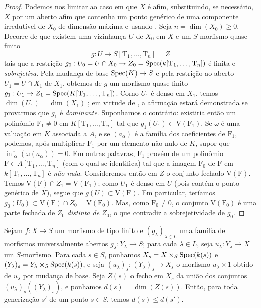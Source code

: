 \begin{proof}
Podemos nos limitar ao caso em que $X$ é afim, substituindo, se necessário, $X$ por um aberto afim que contenha um ponto genérico de uma componente irredutível de $X_0$ de dimensão máxima e usando .
Seja $n=\dim(X_0)\geq 0$.
Decorre de  que existem uma vizinhança $U$ de $X_0$ em $X$ e um $S$-morfismo quase-finito
\[
  g:U\to S[\mathrm{T}_1,\ldots,\mathrm{T}_n]=Z
\]
tais que a restrição $g_0:U_0=U\cap X_0\to Z_0=\Spec(k[\mathrm{T}_1,\ldots,\mathrm{T}_n])$ é finita e \emph{sobrejetiva}.
Pela mudança de base $\Spec(K)\to S$ e pela restrição ao aberto $U_1=U\cap X_1$ de $X_1$, obtemos de $g$ um morfismo quase-finito $g_1:U_1\to Z_1=\Spec(K[\mathrm{T}_1,\ldots,\mathrm{T}_n])$.
Como $U_1$ é denso em $X_1$, temos $\dim(U_1)=\dim(X_1)$ ; em virtude de , a afirmação estará demonstrada se provarmos que $g_1$ é \emph{dominante}.
Suponhamos o contrário: existiria então um polinômio $\mathrm{F}_1\neq 0$ em $K[\mathrm{T}_1,\ldots,\mathrm{T}_n]$ tal que $g_1(U_1)\subset\mathrm{V}(\mathrm{F}_1)$.
Se $\omega$ é uma valuação em $K$ associada a $A$, e se $(a_\alpha)$ é a família dos coeficientes de $\mathrm{F}_1$, podemos, após multiplicar $\mathrm{F}_1$ por um elemento não nulo de $K$, supor que $\inf_\alpha(\omega(a_\alpha))=0$.
Em outras palavras, $\mathrm{F}_1$ provém de um polinômio $\mathrm{F}\in A[\mathrm{T}_1,\ldots,\mathrm{T}_n]$ (com o qual se identifica) tal que a imagem $\mathrm{F}_0$ de $\mathrm{F}$ em $k[\mathrm{T}_1,\ldots,\mathrm{T}_n]$ é \emph{não nula}.
Consideremos então em $Z$ o conjunto fechado $\mathrm{V}(\mathrm{F})$.
Temos $\mathrm{V}(\mathrm{F})\cap Z_1=\mathrm{V}(\mathrm{F}_1)$; como $U_1$ é denso em $U$ (pois contém o ponto genérico de $X$), segue que $g(U)\subset\mathrm{V}(\mathrm{F})$.
Em particular, teríamos $g_0(U_0)\subset\mathrm{V}(\mathrm{F})\cap Z_0=\mathrm{V}(\mathrm{F}_0)$.
Mas, como $\mathrm{F}_0\neq 0$, o conjunto $\mathrm{V}(\mathrm{F}_0)$ é uma parte fechada de $Z_0$ \emph{distinta de $Z_0$}, o que contradiz a sobrejetividade de $g_0$.
\end{proof}


\begin{proposition}[14.3.11]
\label{IV.14.3.11}
Sejam $f:X\to S$ um morfismo de tipo finito e $(g_\lambda)_{\lambda\in L}$ uma família de morfismos universalmente abertos $g_\lambda:Y_\lambda\to S$; para cada $\lambda\in L$, seja $u_\lambda:Y_\lambda\to X$ um $S$-morfismo.
Para cada $s\in S$, ponhamos $X_s=X\times_S\operatorname{Spec}(k(s))$ e $(Y_\lambda)_s=Y_\lambda\times_S\operatorname{Spec}(k(s))$, e seja $(u_\lambda)_s:(Y_\lambda)_s\to X_s$ o morfismo $u_\lambda\times 1$ obtido de $u_\lambda$ por mudança de base.
Seja $Z(s)$ o fecho em $X_s$ da união dos conjuntos $(u_\lambda)_s((Y_\lambda)_s)$, e ponhamos $d(s)=\dim(Z(s))$.
Então, para toda generização $s'$ de um ponto $s\in S$, temos $d(s)\leq d(s')$.
\end{proposition}

